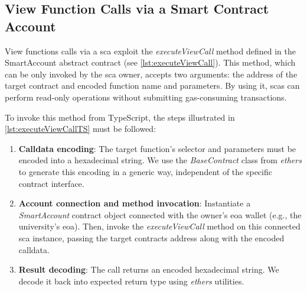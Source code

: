 


\subsection{View Function Calls via a Smart Contract Account}
\label{ssec:viewFunctionCalls}
View functions calls via a \acrshort{sca} exploit the \textit{executeViewCall} method defined in the SmartAccount abstract contract (see \cref{lst:executeViewCall}). This method, which can be only invoked by the \acrshort{sca} owner, accepts two arguments: the address of the target contract and encoded function name and parameters. By using it, \acrshort{sca}s can perform read-only operations without submitting gas-consuming transactions. 


To invoke this method from TypeScript, the steps illustrated in \cref{lst:executeViewCallTS} must be followed:
\begin{enumerate}
    \item \textbf{Calldata encoding}: The target function’s selector and parameters must be encoded into a hexadecimal string. We use the \textit{BaseContract} class from \textit{ethers} to generate this encoding in a generic way, independent of the specific contract interface.
    \item \textbf{Account connection and method invocation}: Instantiate a \textit{SmartAccount} contract object connected with the owner’s \acrshort{eoa} wallet (e.g., the university’s \acrshort{eoa}). Then, invoke the \textit{executeViewCall} method on this connected \acrshort{sca} instance, passing the target contracts address along with the encoded calldata.
    \item \textbf{Result decoding}: The call returns an encoded hexadecimal string. We decode it back into expected return type using \textit{ethers} utilities.
\end{enumerate}



